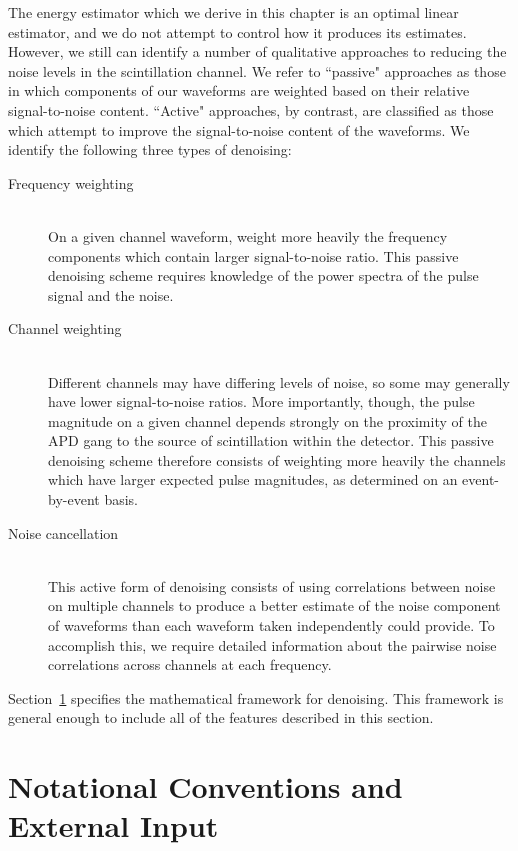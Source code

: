 The energy estimator which we derive in this chapter is an optimal linear estimator, and we do not attempt to control how it produces its estimates.  However, we still can identify a number of qualitative approaches to reducing the noise levels in the scintillation channel.  We refer to ``passive" approaches as those in which components of our waveforms are weighted based on their relative signal-to-noise content.  ``Active" approaches, by contrast, are classified as those which attempt to improve the signal-to-noise content of the waveforms.  We identify the following three types of denoising:
\begin{description}
\item[Frequency weighting] \hfill \\
On a given channel waveform, weight more heavily the frequency components which contain larger signal-to-noise ratio.  This passive denoising scheme requires knowledge of the power spectra of the pulse signal and the noise.

\item[Channel weighting] \hfill \\
Different channels may have differing levels of noise, so some may generally have lower signal-to-noise ratios.  More importantly, though, the pulse magnitude on a given channel depends strongly on the proximity of the APD gang to the source of scintillation within the detector.  This passive denoising scheme therefore consists of weighting more heavily the channels which have larger expected pulse magnitudes, as determined on an event-by-event basis.

\item[Noise cancellation] \hfill \\
This active form of denoising consists of using correlations between noise on multiple channels to produce a better estimate of the noise component of waveforms than each waveform taken independently could provide.  To accomplish this, we require detailed information about the pairwise noise correlations across channels at each frequency.
\end{description}

Section~\ref{sec:DenoisingNotationSetup} specifies the mathematical framework for denoising.  This framework is general enough to include all of the features described in this section.

\section{Notational Conventions and External Input}\label{sec:DenoisingNotationSetup}

